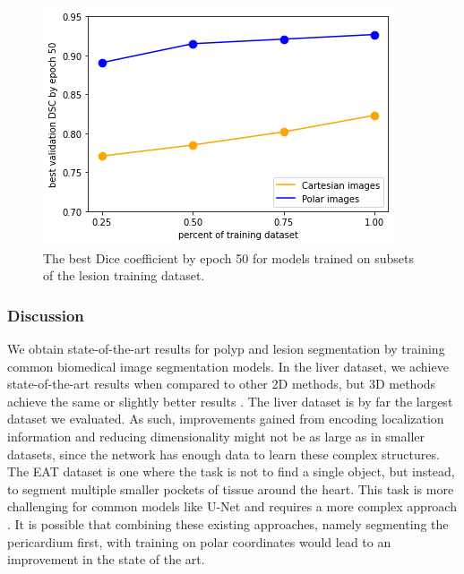 		\begin{figure}[h]
		\centering
		\includegraphics[width=0.65\linewidth]{images/4/dsc-vs-dataset-percent}
		\caption{The best Dice coefficient by epoch 50 for models trained on subsets of the lesion training dataset. \cite{bencevicTrainingPolarImage2021}}
		\label{fig:dataset-vs-dsc}
	\end{figure}
	
	\subsubsection{Discussion}
	
We obtain state-of-the-art results for polyp and lesion segmentation by training common biomedical image segmentation models. In the liver dataset, we achieve state-of-the-art results when compared to other 2D methods, but 3D methods 
achieve the same or slightly better results \cite{valanarasuKiUNetOvercompleteConvolutional2020a}. 
The liver dataset is 
by far the largest dataset we evaluated. As such, improvements gained from 
encoding localization information and reducing dimensionality might not be as large as in smaller 
datasets, since the network has enough data to learn these complex structures.
The EAT dataset is one where the task is not to find a single object, but instead, to segment multiple smaller 
pockets of tissue around the heart. This task is more challenging for common models like U-Net and 
requires a more complex approach \cite{zhangAutomaticEpicardialFat2020a}. It is possible that combining 
these existing approaches, namely segmenting the pericardium first, with training on polar coordinates 
would lead to an improvement in the state of the art.

